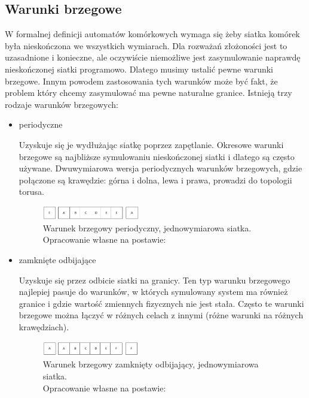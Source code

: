 \documentclass{sprawozdanie-agh}
\begin{document}
			\subsection{Warunki brzegowe}
			\label{sec:warunkiBrzegowe}

			W formalnej definicji automatów komórkowych wymaga się żeby siatka komórek była nieskończona we wszystkich wymiarach. Dla rozważań złożoności jest to uzasadnione i konieczne, ale oczywiście niemożliwe jest zasymulowanie naprawdę nieskończonej siatki programowo. Dlatego musimy ustalić pewne warunki brzegowe. Innym powodem zastosowania tych warunków może być fakt, że problem który chcemy zasymulować ma pewne naturalne granice. Istnieją trzy rodzaje warunków brzegowych:

			\begin{itemize}
				\item periodyczne
				
				Uzyskuje się je wydłużając siatkę poprzez zapętlanie. Okresowe warunki brzegowe są najbliższe symulowaniu nieskończonej siatki i dlatego są często używane. Dwuwymiarowa wersja periodycznych warunków brzegowych, gdzie połączone są krawędzie: górna i dolna, lewa i prawa, prowadzi do topologii torusa.

				\begin{figure}[H]
					\centering
					\captionsetup{justification=centering}
					  \includegraphics[width=0.4\textwidth]{periodic}
					\caption{Warunek brzegowy periodyczny, jednowymiarowa siatka. \\ Opracowanie własne na postawie: \cite{warunkiBrzegowe}}
					\label{fig:periodic}
				\end{figure}

				\item zamknięte odbijające
				
				Uzyskuje się przez odbicie siatki na granicy. Ten typ warunku brzegowego najlepiej pasuje do warunków, w których symulowany system ma również granice i gdzie wartość zmiennych fizycznych nie jest stała. Często te warunki brzegowe można łączyć w różnych celach z innymi (różne warunki na różnych krawędziach).

				\begin{figure}[H]
					\centering
					\captionsetup{justification=centering}
					  \includegraphics[width=0.4\textwidth]{zamknieteOdb}
					\caption{Warunek brzegowy zamknięty odbijający, jednowymiarowa siatka. \\ Opracowanie własne na postawie: \cite{warunkiBrzegowe}}
					\label{fig:closedOdb}
				\end{figure}


\end{itemize}
\end{document}
